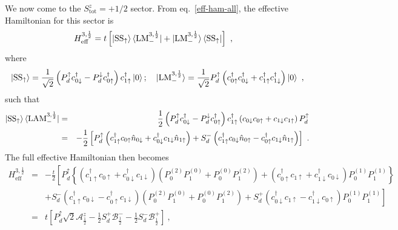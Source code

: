 \documentclass{iopart}
\begin{document}
We now come to the \(S^z_\text{tot}=+ 1/2\) sector. From eq.~\eqref{eff-ham-all}, the effective Hamiltonian for this sector is
\begin{eqnarray}
H_\text{eff}^{3,\frac{1}{2}} &= t \left[\ket{\text{SS}_\uparrow}\bra{\text{LM}_-^{3,\frac{1}{2}}} + \ket{\text{LM}_-^{3,\frac{1}{2}}}\bra{\text{SS}_\uparrow}\right]~,
\end{eqnarray}
where
\begin{eqnarray}
	\ket{\text{SS}_\uparrow} = \frac{1}{\sqrt 2}\left(P_d^{ \uparrow} c^\dagger_{0 \downarrow} - P_d^{ \downarrow} c^\dagger_{0 \uparrow} \right) c^\dagger_{1 \uparrow}\ket{0}; \quad\ket{\text{LM}_-^{3,\frac{1}{2}}} = \frac{1}{\sqrt 2} P_d^\uparrow \left(c^\dagger_{0 \uparrow} c^\dagger_{0 \downarrow} + c^\dagger_{1 \uparrow} c^\dagger_{1 \downarrow}\right) \ket{0}~,
\end{eqnarray}
such that
\begin{eqnarray}
	\ket{\text{SS}_\uparrow}\bra{\text{LAM}_-^{3,\frac{1}{2}}} &=& \frac{1}{2}\left(P_d^{ \uparrow} c^\dagger_{0 \downarrow} - P_d^{ \downarrow} c^\dagger_{0 \uparrow} \right) c^\dagger_{1 \uparrow}  \left(c_{0 \downarrow} c_{0 \uparrow} + c_{1 \downarrow} c_{1 \uparrow}\right)P_d^\uparrow \\
								   &=& -\frac{1}{2}\left[P_d^{ \uparrow} \left(c^\dagger_{1 \uparrow} c_{0 \uparrow}\hat n_{0 \downarrow} + c^\dagger_{0 \downarrow} c_{1 \downarrow} \hat n_{1 \uparrow}\right) + S_d^- \left(c^\dagger_{1 \uparrow}c_{0 \downarrow} \hat n_{0 \uparrow} - c^\dagger_{0 \uparrow} c_{1 \downarrow} \hat n_{1 \uparrow}\right)\right]~.
\end{eqnarray}
The full effective Hamiltonian then becomes
\begin{eqnarray}
	H_\text{eff}^{3,\frac{1}{2}} &=& -\frac{t}{2}\left[P_d^{ \uparrow} \left\{\left(c^\dagger_{1 \uparrow} c_{0 \uparrow} + c^\dagger_{0 \downarrow} c_{1 \downarrow}\right)\left( P_0^{(2)} P_1^{(0)} + P_0^{(0)} P_1^{(2)}\right) + \left(c^\dagger_{0 \uparrow} c_{1 \uparrow} + c^\dagger_{1 \downarrow} c_{0 \downarrow}\right) P_0^{(1)} P_1^{(1)}\right\} \right.\nonumber \\
				     &&\left.+ S_d^- \left(c^\dagger_{1 \uparrow}c_{0 \downarrow} - c^\dagger_{0 \uparrow} c_{1 \downarrow} \right)\left( P_0^{(2)} P_1^{(0)} + P_0^{(0)} P_1^{(2)}\right) + S_d^+ \left(c^\dagger_{0 \downarrow}c_{1 \uparrow} - c^\dagger_{1 \downarrow} c_{0 \uparrow} \right)P_0^{(1)} P_1^{(1)}\right] \nonumber\\
				      &=& t\left[P_d^{ \uparrow} \sqrt 2\mathcal{A}^z_\frac{1}{2} - \frac{1}{2}S_d^+ \mathcal{B}^-_\frac{1}{2} - \frac{1}{2}S_d^- \mathcal{B}^+_\frac{1}{2}\right] ~,
\end{eqnarray}
\end{document}
